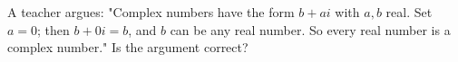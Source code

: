 A teacher argues: "Complex numbers have the form $b+ai$ with $a,b$ real. Set $a=0$; then $b+0i=b$, and $b$ can be any real number. So every real number is a complex number." Is the argument correct?
